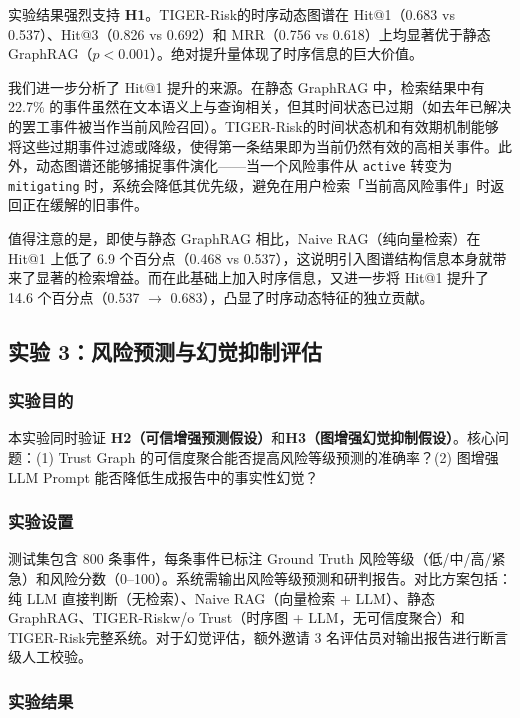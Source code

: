 \documentclass[12pt,a4paper]{article}
\newcommand{\projectshort}{TIGER-Risk}
\begin{document}
实验结果强烈支持 \textbf{H1}。\projectshort 的时序动态图谱在 Hit@1（0.683 vs 0.537）、Hit@3（0.826 vs 0.692）和 MRR（0.756 vs 0.618）上均显著优于静态 GraphRAG（$p < 0.001$）。绝对提升量体现了时序信息的巨大价值。

我们进一步分析了 Hit@1 提升的来源。在静态 GraphRAG 中，检索结果中有 22.7\% 的事件虽然在文本语义上与查询相关，但其时间状态已过期（如去年已解决的罢工事件被当作当前风险召回）。\projectshort 的时间状态机和有效期机制能够将这些过期事件过滤或降级，使得第一条结果即为当前仍然有效的高相关事件。此外，动态图谱还能够捕捉事件演化——当一个风险事件从 \texttt{active} 转变为 \texttt{mitigating} 时，系统会降低其优先级，避免在用户检索「当前高风险事件」时返回正在缓解的旧事件。

值得注意的是，即使与静态 GraphRAG 相比，Naive RAG（纯向量检索）在 Hit@1 上低了 6.9 个百分点（0.468 vs 0.537），这说明引入图谱结构信息本身就带来了显著的检索增益。而在此基础上加入时序信息，又进一步将 Hit@1 提升了 14.6 个百分点（0.537 $\to$ 0.683），凸显了时序动态特征的独立贡献。

\subsection{实验 3：风险预测与幻觉抑制评估}
\label{sec:exp-prediction}

\subsubsection{实验目的}

本实验同时验证 \textbf{H2（可信增强预测假设）}和\textbf{H3（图增强幻觉抑制假设）}。核心问题：(1) Trust Graph 的可信度聚合能否提高风险等级预测的准确率？(2) 图增强 LLM Prompt 能否降低生成报告中的事实性幻觉？

\subsubsection{实验设置}

测试集包含 800 条事件，每条事件已标注 Ground Truth 风险等级（低/中/高/紧急）和风险分数（0--100）。系统需输出风险等级预测和研判报告。对比方案包括：纯 LLM 直接判断（无检索）、Naive RAG（向量检索 + LLM）、静态 GraphRAG、\projectshort w/o Trust（时序图 + LLM，无可信度聚合）和\projectshort 完整系统。对于幻觉评估，额外邀请 3 名评估员对输出报告进行断言级人工校验。

\subsubsection{实验结果}
\end{document}
